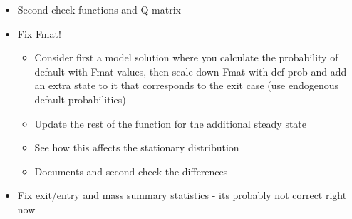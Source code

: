 \documentclass[12pt]{article}
\begin{document}
\begin{itemize}
    \item Second check functions and Q matrix  \checkmark
    \item Fix Fmat!   \checkmark    
        \begin{itemize}
        \item Consider first a model solution where you calculate the probability of default with Fmat values, then scale down Fmat with def-prob and add an extra state to it that corresponds to the exit case (use endogenous default probabilities)  \checkmark
        \item Update the rest of the function for the additional steady state  \checkmark
        \item See how this affects the stationary distribution \checkmark
        \item Documents and second check the differences  \checkmark
    \end{itemize}
    \item Fix exit/entry and mass summary statistics - its probably not correct right now  
\end{itemize} \normalsize

\newpage

    
\end{document}

